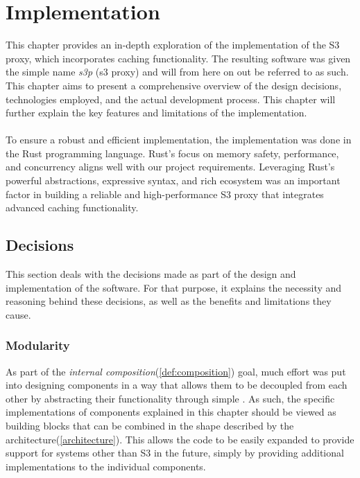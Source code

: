 \chapter{Implementation}

This chapter provides an in-depth exploration of the implementation of the S3 proxy, which incorporates caching functionality. The resulting software was given the simple name \textit{s3p} (s3 proxy) and will from here on out be referred to as such. This chapter aims to present a comprehensive overview of the design decisions, technologies employed, and the actual development process. This chapter will further explain the key features and limitations of the implementation.
\\\\
To ensure a robust and efficient implementation, the implementation was done in the Rust programming language. Rust's focus on memory safety, performance, and concurrency aligns well with our project requirements. Leveraging Rust's powerful abstractions, expressive syntax, and rich ecosystem was an important factor in building a reliable and high-performance S3 proxy that integrates advanced caching functionality.

\section{Decisions}

This section deals with the decisions made as part of the design and implementation of the software. For that purpose, it explains the necessity and reasoning behind these decisions, as well as the benefits and limitations they cause.

\subsection{Modularity}

As part of the \textit{internal composition}(\ref{def:composition}) goal, much effort was put into designing components in a way that allows them to be decoupled from each other by abstracting their functionality through simple . As such, the specific implementations of components explained in this chapter should be viewed as building blocks that can be combined in the shape described by the architecture(\ref{architecture}).
This allows the code to be easily expanded to provide support for systems other than S3 in the future, simply by providing additional implementations to the individual components.

